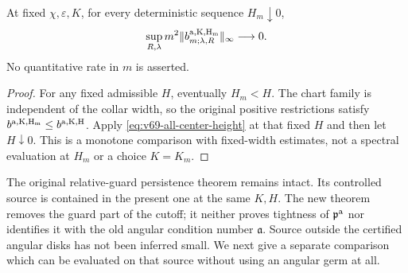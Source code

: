\begin{corollary}
\label{cor:v69-shrinking-collars}
At fixed $\chi,\varepsilon,K$, for every deterministic sequence
$H_m\downarrow0$,
\[
 \sup_{R,\lambda}m^2
        \|b^{\rm a,K,H_m}_{m;\lambda,R}\|_\infty\longrightarrow0.
\]
No quantitative rate in $m$ is asserted.
\end{corollary}
\begin{proof}
For any fixed admissible $H$, eventually $H_m<H$. The chart family
is independent of the collar width, so the original positive
restrictions satisfy $b^{\rm a,K,H_m}\le b^{\rm a,K,H}$.
Apply \eqref{eq:v69-all-center-height} at that fixed $H$ and then
let $H\downarrow0$. This is a monotone comparison with fixed-width
estimates, not a spectral evaluation at $H_m$ or a choice $K=K_m$.
\end{proof}

The original relative-guard persistence theorem remains intact. Its
controlled source is contained in the present one at the same
$K,H$. The new theorem removes the guard part of the cutoff; it
neither proves tightness of $\mathfrak p^{\rm a}$ nor identifies it
with the old angular condition number $\mathfrak a$. Source outside
the certified angular disks has not been inferred small. We next
give a separate comparison which can be evaluated on that source
without using an angular germ at all.
